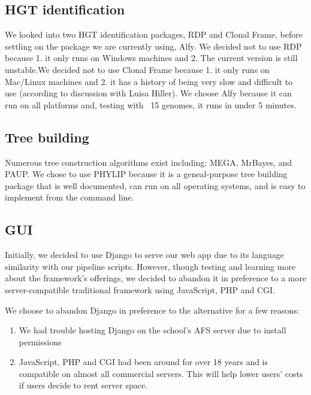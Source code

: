 \documentclass[12pt]{article}
\newcommand{\tab}{\hspace*{3em}}
\begin{document}
\subsection{HGT identification}
\tab We looked into two HGT identification packages, RDP and Clonal Frame, before settling on the package we are currently using, Alfy. We decided not to use RDP \cite{RDP} because 1. it only runs on Windows machines and 2. The current version is still unstable.We decided not to use Clonal Frame \cite{Clonal Frame} because 1. it only runs on Mac/Linux machines and 2. it has a history of being very slow and difficult to use (according to discussion with Luisa Hiller). We choose Alfy \cite{Alfy} because it can run on all platforms and, testing with ~15 genomes, it runs in under 5 minutes.

\subsection{Tree building}
\tab Numerous tree construction algorithms exist including: MEGA, MrBayes, and PAUP. We chose to use PHYLIP \cite{phylip} because it is a geneal-purpose tree building package that is well documented, can run on all operating systems, and is easy to implement from the command line. 

\subsection{GUI}
\tab Initially, we decided to use Django to serve our web app due to its language similarity with our pipeline scripts. However, though testing and learning more about the framework's offerings, we decided to abandon it in preference to a more server-compatible traditional framework using JavaScript, PHP and CGI.\\
\bigskip

We choose to abandon Django in preference to the alternative for a few reasons:
\begin{enumerate}
	\item We had trouble hosting Django on the school's AFS server due to install permissions
	\item JavaScript, PHP and CGI had been around for over 18 years and is compatible on almost all commercial servers. This will help lower users' costs if users decide to rent server space.
\end{enumerate}
\end{document}
